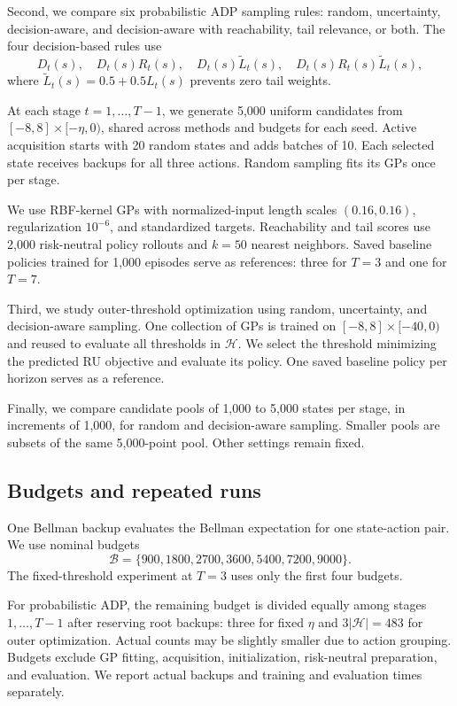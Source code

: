 Second, we compare six probabilistic ADP sampling rules: random, uncertainty, decision-aware, and decision-aware with reachability, tail relevance, or both. The four decision-based rules use
\begin{equation}
	D_t(s), \quad
	D_t(s)R_t(s), \quad
	D_t(s)\tilde{L}_t(s), \quad
	D_t(s)R_t(s)\tilde{L}_t(s),
	\label{test-scores}
\end{equation}
where $\tilde{L}_t(s)=0.5+0.5L_t(s)$ prevents zero tail weights.

At each stage $t=1,\dots,T-1$, we generate 5,000 uniform candidates from $[-8,8]\times[-\eta,0)$, shared across methods and budgets for each seed. Active acquisition starts with 20 random states and adds batches of 10. Each selected state receives backups for all three actions. Random sampling fits its GPs once per stage.

We use RBF-kernel GPs with normalized-input length scales $(0.16,0.16)$, regularization $10^{-6}$, and standardized targets. Reachability and tail scores use 2,000 risk-neutral policy rollouts and $k=50$ nearest neighbors. Saved baseline policies trained for 1,000 episodes serve as references: three for $T=3$ and one for $T=7$.

Third, we study outer-threshold optimization using random, uncertainty, and decision-aware sampling. One collection of GPs is trained on $[-8,8]\times[-40,0)$ and reused to evaluate all thresholds in $\mathcal{H}$. We select the threshold minimizing the predicted RU objective and evaluate its policy. One saved baseline policy per horizon serves as a reference.

Finally, we compare candidate pools of 1,000 to 5,000 states per stage, in increments of 1,000, for random and decision-aware sampling. Smaller pools are subsets of the same 5,000-point pool. Other settings remain fixed.

\subsection{Budgets and repeated runs}
\label{exp:budgets}

One Bellman backup evaluates the Bellman expectation for one state-action pair. We use nominal budgets
\begin{equation}
	\mathcal{B}
	=\{900,1800,2700,3600,5400,7200,9000\}.
	\label{test-budgets}
\end{equation}
The fixed-threshold experiment at $T=3$ uses only the first four budgets.

For probabilistic ADP, the remaining budget is divided equally among stages $1,\dots,T-1$ after reserving root backups: three for fixed $\eta$ and $3|\mathcal{H}|=483$ for outer optimization. Actual counts may be slightly smaller due to action grouping. Budgets exclude GP fitting, acquisition, initialization, risk-neutral preparation, and evaluation. We report actual backups and training and evaluation times separately.

